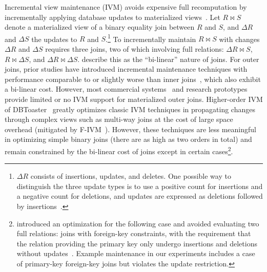 \documentclass[biblatex, english]{lni}
\DeclareMathOperator{\JOIN}{\bowtie}
\begin{document}
Incremental view maintenance (IVM) avoids expensive full recomputation by incrementally applying database updates to materialized views~\cite{gupta1995maintenance,Zhuge1995ViewMaintenance,Blakeley1990PerformanceAnalysis}.
Let \(R \JOIN S\) denote a materialized view of a binary equality join between \(R\) and \(S\), and \(\Delta R\) and \(\Delta S\) the updates to \(R\) and \(S\).\footnote{
    \(\Delta R\) consists of insertions, updates, and deletes. One possible way to distinguish the three update types is to use a positive count for insertions and a negative count for deletions, and updates are expressed as deletions followed by insertions~\cite{mumick1997maintenance,GUPTAchangetable,mv12,dbtoasterFK}.
}
To incrementally maintain \(R \JOIN S\) with changes \(\Delta R\) and \(\Delta S\) requires three joins, two of which involving full relations: \(\Delta R \JOIN S\), \(R \JOIN \Delta S\), and \(\Delta R \JOIN \Delta S\).
\citet{Budiu2023DBSP} describe this as the ``bi-linear'' nature of joins.
For outer joins, prior studies have introduced incremental maintenance techniques with performance comparable to or slightly worse than inner joins~\cite{GUPTAchangetable, larson2007outerjoin}, which also exhibit a bi-linear cost.
However, most commercial systems~\cite{mysql2024viewupdatability, microsoft2024indexedviews, oracle2024mvrefresh, databricks2018stream} and research prototypes~\cite{dbtoaster} provide limited or no IVM support for materialized outer joins.
Higher-order IVM of DBToaster~\cite{dbtoaster} greatly optimizes classic IVM techniques in propagating changes through complex views such as multi-way joins at the cost of large space overhead (mitigated by F-IVM~\cite{f-ivm}).
However, these techniques are less meaningful in optimizing simple binary joins (there are as high as two orders in total) and remain constrained by the bi-linear cost of joins except in certain cases\footnote{
     introduced an optimization for the following case and avoided evaluating two full relations: joins with foreign-key constraints, with the requirement that the relation providing the primary key only undergo insertions and deletions without updates~\cite{dbtoasterFK}.
    Example maintenance in our experiments includes a case of primary-key foreign-key joins but violates the update restriction.
}.
\end{document}
